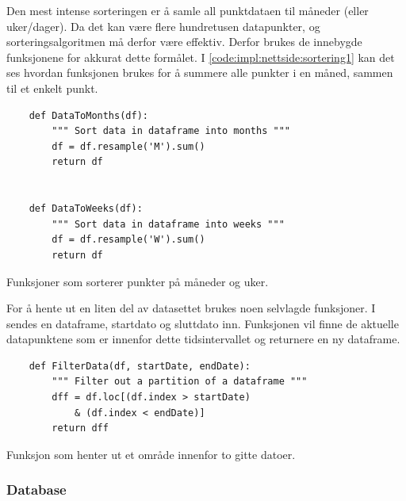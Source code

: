 Den mest intense sorteringen er å samle all punktdataen til måneder (eller uker/dager). 
Da det kan være flere hundretusen datapunkter, og sorteringsalgoritmen må derfor være effektiv. 
Derfor brukes de innebygde funksjonene for akkurat dette formålet. 
I \autoref{code:impl:nettside:sortering1} kan det ses hvordan funksjonen  brukes for å summere alle punkter i en måned, sammen til et enkelt punkt.

\begin{listing}[!htb]
\begin{verbatim}
    def DataToMonths(df):
        """ Sort data in dataframe into months """
        df = df.resample('M').sum()
        return df
    
    
    def DataToWeeks(df):
        """ Sort data in dataframe into weeks """
        df = df.resample('W').sum()
        return df
\end{verbatim}
\caption{Funksjoner som sorterer punkter på måneder og uker.}
\label{code:impl:nettside:sortering1}
\end{listing}

For å hente ut en liten del av datasettet brukes noen selvlagde funksjoner. 
I  sendes en dataframe, startdato og sluttdato inn. 
Funksjonen vil finne de aktuelle datapunktene som er innenfor dette tidsintervallet og returnere en ny dataframe.

\begin{listing}[!htb]
\begin{verbatim}
    def FilterData(df, startDate, endDate):
        """ Filter out a partition of a dataframe """
        dff = df.loc[(df.index > startDate)
            & (df.index < endDate)]
        return dff
\end{verbatim}
\caption{Funksjon som henter ut et område innenfor to gitte datoer.}
\label{code:impl:nettside:sortering2}
\end{listing}


\subsubsection{Database}\label{sec:impl:nettside:database}

